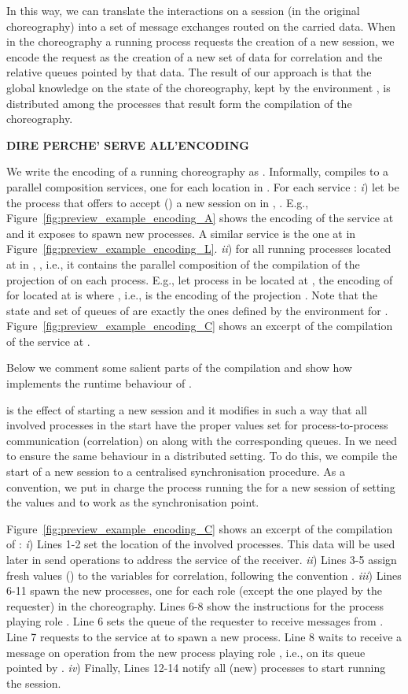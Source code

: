 In this way, we can translate the interactions on a session (in the original
choreography) into a set of message exchanges routed on the carried data. When
in the choreography a running process requests the creation of a new session,
we encode the request as the creation of a new set of data for correlation and
the relative queues pointed by that data. The result of our approach is that
the global knowledge on the state of the choreography, kept by the environment
, is distributed among the processes that result form the compilation of
the choreography.

\textbf{DIRE PERCHE' SERVE  ALL'ENCODING} 

We write the encoding of a running choreography  as .
Informally,  compiles to a parallel composition services, one
for
each location in . For each service :
\emph{i}) let  be the process that offers to accept ()
a new session on  in , . E.g.,
Figure~\ref{fig:preview_example_encoding_A} shows the encoding of the service
at  and it exposes 
to spawn new processes. A similar service is the one at  in
Figure~\ref{fig:preview_example_encoding_L}.
\emph{ii}) for all running processes  located at
 in , , i.e., it contains the parallel composition of
the compilation of the projection of  on each process. E.g., let process
 in  be located at , the encoding of  for 
located at  is  where , i.e.,  is the encoding of the projection .
Note that the state and set of queues of  are exactly the ones defined by
the environment  for .
Figure~\ref{fig:preview_example_encoding_C} shows an excerpt of the compilation
of the service at .


Below we comment some salient parts of the compilation and show how  implements the runtime behaviour of .

 is
the effect of starting a new session and it modifies  in such a way
that all involved processes in the start have the proper values set for
process-to-process communication (correlation) on  along with the
corresponding queues. In  we need to ensure the same behaviour in
a distributed setting. To do this, we compile the start of a new session to a
centralised synchronisation procedure. As a convention, we put in charge the
process running the  for a new session of setting the values
and to work as the synchronisation point.

Figure~\ref{fig:preview_example_encoding_C} shows an excerpt of the compilation
of : \emph{i}) Lines 1-2 set the location of the involved
processes. This data will be used later in send operations to address the
service of the receiver. \emph{ii}) Lines 3-5 assign fresh values () to
the variables for correlation, following the convention
. \emph{iii}) Lines 6-11 spawn the new
processes, one for each role (except the one played by the requester) in the
choreography. Lines 6-8 show the instructions for the process playing role
. Line 6 sets the queue of the requester to receive messages from
. Line 7 requests to the service at  to spawn a new
process. Line 8 waits to receive a message on operation  from the new
process playing role , i.e., on its queue pointed by
. \emph{iv}) Finally, Lines 12-14 notify all (new) processes
to start running the session.

